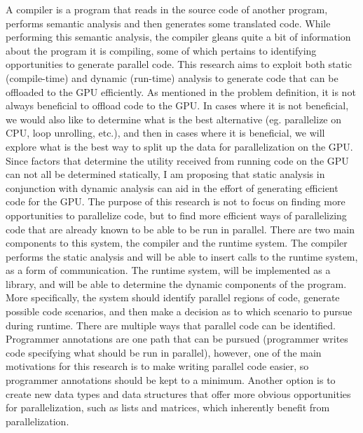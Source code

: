 \documentclass[a4paper,12pt]{article}
\newcommand{\tab}{\hspace*{2em}}
\begin{document}
\newline\tab
A compiler is a program that reads in the source code of another program, performs semantic analysis and then generates some translated code.  While performing this semantic analysis, the compiler gleans quite a bit of information about the program it is compiling, some of which pertains to identifying opportunities to generate parallel code. This research aims to exploit both static (compile-time) and dynamic (run-time) analysis to generate code that can be offloaded to the GPU efficiently.  As mentioned in the problem definition, it is not always beneficial to offload code to the GPU.  In cases where it is not beneficial, we would also like to determine what is the best alternative (eg. parallelize on CPU, loop unrolling, etc.), and then in cases where it is beneficial, we will explore what is the best way to split up the data for parallelization on the GPU.  Since factors that determine the utility received from running code on the GPU can not all be determined statically, I am proposing that static analysis in conjunction with dynamic analysis can aid in the effort of generating efficient code for the GPU.  The purpose of this research is not to focus on finding more opportunities to parallelize code, but to find more efficient ways of parallelizing code that are already known to be able to be run in parallel. 
\newline\tab
There are two main components to this system, the compiler and the runtime system.  The compiler performs the static analysis and will be able to insert calls to the runtime system, as a form of communication.  The runtime system, will be implemented as a library, and will be able to determine the dynamic components of the program.  More specifically, the system should identify parallel regions of code, generate possible code scenarios, and then make a decision as to which scenario to pursue during runtime.
\newline\tab
There are multiple ways that parallel code can be identified.  Programmer annotations are one path that can be pursued (programmer writes code specifying what should be run in parallel)\cite{annotations}, however, one of the main motivations for this research is to make writing parallel code easier, so programmer annotations should be kept to a minimum.  Another option is to create new data types and data structures that offer more obvious opportunities for parallelization, such as lists and matrices, which inherently benefit from parallelization.
\end{document}
